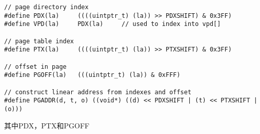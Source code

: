 \documentclass{article}
\begin{document}
\begin{CJK*}{UTF8}{gkai}
\begin{lstlisting}[style=ccode, firstnumber=16, title={\scriptsize \ttfamily \bfseries inc/mmu.h}]
// page directory index
#define PDX(la)		((((uintptr_t) (la)) >> PDXSHIFT) & 0x3FF)
#define VPD(la)		PDX(la)		// used to index into vpd[]

// page table index
#define PTX(la)		((((uintptr_t) (la)) >> PTXSHIFT) & 0x3FF)

// offset in page
#define PGOFF(la)	(((uintptr_t) (la)) & 0xFFF)

// construct linear address from indexes and offset
#define PGADDR(d, t, o)	((void*) ((d) << PDXSHIFT | (t) << PTXSHIFT | (o)))
\end{lstlisting}


其中PDX，PTX和PGOFF

\begin{lstlisting}[style=ccode, title={\scriptsize \ttfamily \bfseries kern/pmap.c: boot\_alloc ()}]
\end{lstlisting}

\begin{lstlisting}[style=ccode, title={\scriptsize \ttfamily \bfseries kern/pmap.c: boot\_alloc ()}]
\end{lstlisting}

\begin{lstlisting}[style=ccode, title={\scriptsize \ttfamily \bfseries kern/pmap.c: boot\_alloc ()}]
\end{lstlisting}




\begin{lstlisting}[style=console]
\end{lstlisting}

\begin{lstlisting}[style=console]
\end{lstlisting}

\begin{lstlisting}[style=console]
\end{lstlisting}

\begin{lstlisting}[style=console]
\end{lstlisting}

\begin{lstlisting}[style=console]
\end{lstlisting}



\begin{lstlisting}[style=exercise]
\end{lstlisting}

\begin{lstlisting}[style=exercise]
\end{lstlisting}


\end{CJK*}
\end{document}
